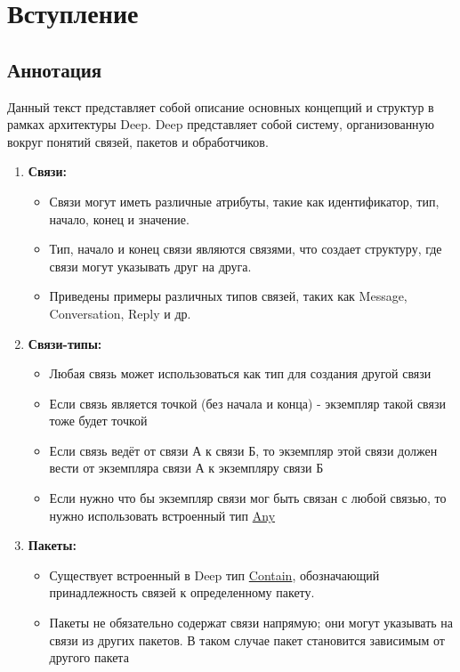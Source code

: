 \section{Вступление}
\subsection{Аннотация}

Данный текст представляет собой описание основных концепций и структур в рамках
архитектуры Deep. Deep представляет собой систему, организованную вокруг
понятий связей, пакетов и обработчиков.

\begin{enumerate}
  \item \textbf{Связи:}
        \begin{itemize}
          \item Связи могут иметь различные атрибуты, такие как
                идентификатор,
                тип, начало, конец и значение.
          \item Тип, начало и конец связи являются связями, что создает
                структуру, где связи могут указывать друг на друга.
          \item Приведены примеры различных типов связей, таких как
                Message,
                Conversation, Reply и др.
        \end{itemize}

  \item \textbf{Связи-типы:}
        \begin{itemize}
          \item Любая связь может использоваться как тип для создания
                другой
                связи
          \item Если связь является точкой (без начала и конца) -
                экземпляр
                такой связи тоже будет точкой
          \item Если связь ведёт от связи А к связи Б, то экземпляр
                этой связи
                должен вести от экземпляра связи А к экземпляру связи Б
          \item Если нужно что бы экземпляр связи мог быть связан с
                любой
                связью,
                то нужно использовать встроенный тип
                \hyperlink{Core.Any.Description}{Any}
        \end{itemize}

  \item \textbf{Пакеты:}
        \begin{itemize}
          \item Существует встроенный в Deep тип
                \hyperlink{Core.Contain.Description}{Contain},
                обозначающий
                принадлежность связей к определенному пакету.
          \item Пакеты не обязательно содержат связи напрямую; они
                могут
                указывать на связи из других пакетов. В таком случае
                пакет
                становится зависимым от другого пакета
        \end{itemize}


\end{enumerate}
